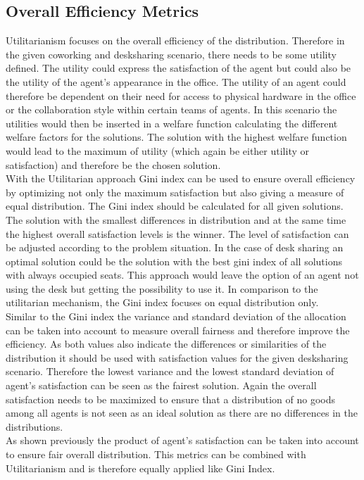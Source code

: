 \documentclass[german, a4paper, 11pt, oneside]{scrbook}
\begin{document}
\subsection{Overall Efficiency Metrics}
Utilitarianism focuses on the overall efficiency of the distribution. Therefore in the given coworking and desksharing scenario, there needs to be some utility defined. The utility could express the satisfaction of the agent but could also be the utility of the agent's appearance in the office. The utility of an agent could therefore be dependent on their need for access to physical hardware in the office or the collaboration style within certain teams of agents. In this scenario the utilities would then be inserted in a welfare function calculating the different welfare factors for the solutions. The solution with the highest welfare function would lead to the maximum of utility (which again be either utility or satisfaction) and therefore be the chosen solution. \\With the Utilitarian approach Gini index can be used to ensure overall efficiency by optimizing not only the maximum satisfaction but also giving a measure of equal distribution. The Gini index should be calculated for all given solutions. The solution with the smallest differences in distribution and at the same time the highest overall satisfaction levels is the winner. The level of satisfaction can be adjusted according to the problem situation. In the case of desk sharing an optimal solution could be the solution with the best gini index of all solutions with always occupied seats. This approach would leave the option of an agent not using the desk but getting the possibility to use it. In comparison to the utilitarian mechanism, the Gini index focuses on equal distribution only.
\\Similar to the Gini index the variance and standard deviation of the allocation can be taken into account to measure overall fairness and therefore improve the efficiency. As both values also indicate the differences or similarities of the distribution it should be used with satisfaction values for the given desksharing scenario. Therefore the lowest variance and the lowest standard deviation of agent's satisfaction can be seen as the fairest solution. Again the overall satisfaction needs to be maximized to ensure that a distribution of no goods among all agents is not seen as an ideal solution as there are no differences in the distributions.
\\ As shown previously the product of agent's satisfaction can be taken into account to ensure fair overall distribution. This metrics can be combined with Utilitarianism and is therefore equally applied like Gini Index.
\end{document}
